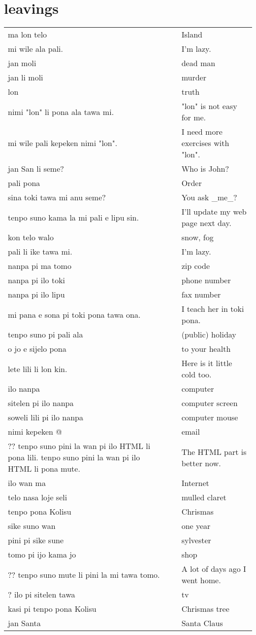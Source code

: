 \section{leavings}

\begin{supertabular}{p{5,5cm}|ll}
ma lon telo && Island \\
mi wile ala pali. && I'm lazy. \\
jan moli && dead man \\
jan li moli && murder \\
lon  && truth \\
nimi "lon" li pona ala tawa mi. && "lon" is not easy for me. \\
mi wile pali kepeken nimi "lon". && I need more exercises with "lon". \\
jan San li seme? && Who is John? \\
pali pona && Order \\
sina toki tawa mi anu seme? && You ask _me_? \\
tenpo suno kama la mi pali e lipu sin. && I'll update my web page next day. \\
kon telo walo && snow, fog \\
pali li ike tawa mi. && I'm lazy. \\
nanpa pi ma tomo && zip code \\
nanpa pi ilo toki && phone number \\
nanpa pi ilo lipu && fax number \\ %
mi pana e sona pi toki pona tawa ona. && I teach her in toki pona. \\
tenpo suno pi pali ala && (public) holiday \\
o jo e sijelo pona && to your health \\
lete lili li lon kin. && Here is it little cold too. \\
ilo nanpa && computer \\
sitelen pi ilo nanpa && computer screen \\
soweli lili pi ilo nanpa && computer mouse \\
nimi kepeken @ && email \\ ??
tenpo suno pini la wan pi ilo HTML li pona lili. tenpo suno pini la wan pi ilo HTML li pona mute. && The HTML part is better now. \\
ilo wan ma && Internet \\
telo nasa loje seli && mulled claret \\
tenpo pona Kolisu && Chrismas \\
sike suno wan && one year \\
pini pi sike sune && sylvester \\
tomo pi ijo kama jo && shop \\ ??
tenpo suno mute li pini la mi tawa tomo. && A lot of days ago I went home. \\ ?
ilo pi sitelen tawa && tv \\
kasi pi tenpo pona Kolisu && Chrismas tree \\
jan Santa && Santa Claus \\
\end{supertabular} 



